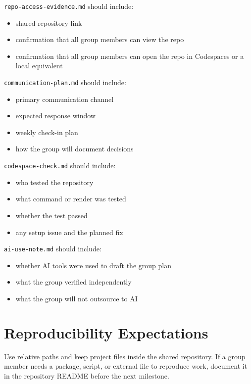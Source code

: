 \documentclass[
  letterpaper,
  DIV=11,
  numbers=noendperiod,
  oneside]{scrreprt}
\providecommand{\tightlist}{%
  \setlength{\itemsep}{0pt}\setlength{\parskip}{0pt}}
\begin{document}
\texttt{repo-access-evidence.md} should include:

\begin{itemize}
\tightlist
\item
  shared repository link
\item
  confirmation that all group members can view the repo
\item
  confirmation that all group members can open the repo in Codespaces or
  a local equivalent
\end{itemize}

\texttt{communication-plan.md} should include:

\begin{itemize}
\tightlist
\item
  primary communication channel
\item
  expected response window
\item
  weekly check-in plan
\item
  how the group will document decisions
\end{itemize}

\texttt{codespace-check.md} should include:

\begin{itemize}
\tightlist
\item
  who tested the repository
\item
  what command or render was tested
\item
  whether the test passed
\item
  any setup issue and the planned fix
\end{itemize}

\texttt{ai-use-note.md} should include:

\begin{itemize}
\tightlist
\item
  whether AI tools were used to draft the group plan
\item
  what the group verified independently
\item
  what the group will not outsource to AI
\end{itemize}

\section{Reproducibility
Expectations}\label{reproducibility-expectations-2}

Use relative paths and keep project files inside the shared repository.
If a group member needs a package, script, or external file to reproduce
work, document it in the repository README before the next milestone.
\end{document}
